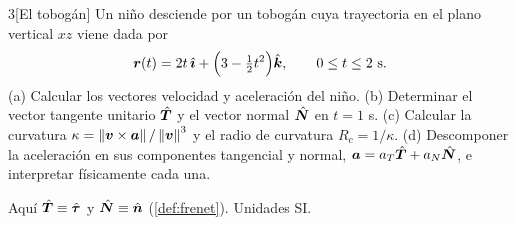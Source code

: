 \begin{problema}{3}[El tobogán]
\label{prob:3}
Un niño desciende por un tobogán cuya trayectoria en el plano vertical $xz$
viene dada por
\[
  \bm{r}(t)=2t\,\hat{\bm{\imath}}+\Bigl(3-\tfrac12t^{2}\Bigr)\hat{\bm{k}},\qquad 0\le t\le2\ \mathrm{s}.
\]
(a) Calcular los vectores velocidad y aceleración del niño. (b) Determinar
el vector tangente unitario $\hat{\bm{T}}$ y el vector normal $\hat{\bm{N}}$ en $t=1$ s.
(c) Calcular la curvatura $\kappa=\left\lVert \bm{v}\times\bm{a}\right\rVert/\left\lVert \bm{v}\right\rVert^{3}$ y el radio de
curvatura $R_{c}=1/\kappa$. (d) Descomponer la aceleración en sus componentes
tangencial y normal, $\bm{a}=a_{T}\hat{\bm{T}}+a_{N}\hat{\bm{N}}$, e interpretar
físicamente cada una.
\end{problema}

\begin{notacion}
Aquí $\hat{\bm{T}}\equiv\hat{\bm{\tau}}$ y $\hat{\bm{N}}\equiv\hat{\bm{n}}$ (\cref{def:frenet}). Unidades SI.
\end{notacion}

